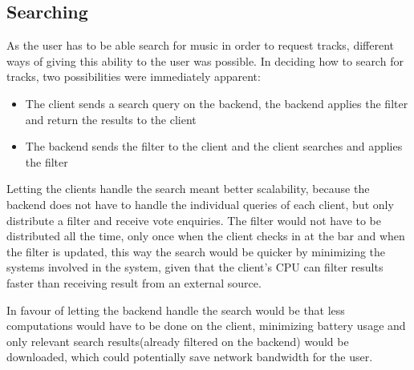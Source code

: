 \subsection{Searching}
As the user has to be able search for music in order to request tracks, different ways of giving this ability to the user was possible. In deciding how to search for tracks, two possibilities were immediately apparent:
\begin{itemize}
  \item The client sends a search query on the backend, the backend applies the filter and return the results to the client
  \item The backend sends the filter to the client and the client searches and applies the filter
\end{itemize}
Letting the clients handle the search meant better scalability, because the backend does not have to handle the individual queries of each client, but only distribute a filter and receive vote enquiries. The filter would not have to be distributed all the time, only once when the client checks in at the bar and when the filter is updated, this way the search would be quicker by minimizing the systems involved in the system, given that the client's CPU can filter results faster than receiving result from an external source.

In favour of letting the backend handle the search would be that less computations would have to be done on the client, minimizing battery usage and only relevant search results(already filtered on the backend) would be downloaded, which could potentially save network bandwidth for the user.
